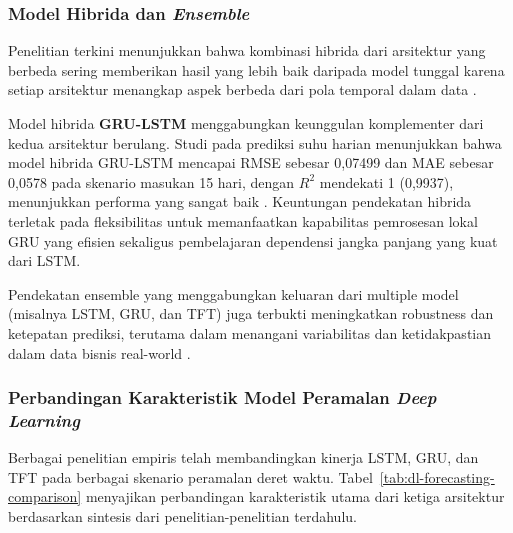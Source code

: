 \subsubsection{Model Hibrida dan \textit{Ensemble}}

Penelitian terkini menunjukkan bahwa kombinasi hibrida dari arsitektur yang berbeda sering memberikan hasil yang lebih baik daripada model tunggal karena setiap arsitektur menangkap aspek berbeda dari pola temporal dalam data \autocite{Yunita2025NNComparison,Zhang2024ComprehensiveTSFSurvey}.

Model hibrida \textbf{GRU-LSTM} menggabungkan keunggulan komplementer dari kedua arsitektur berulang. Studi pada prediksi suhu harian menunjukkan bahwa model hibrida GRU-LSTM mencapai RMSE sebesar 0{,}07499 dan MAE sebesar 0{,}0578 pada skenario masukan 15 hari, dengan \(R^2\) mendekati 1 (0{,}9937), menunjukkan performa yang sangat baik \autocite{Diqi2023GRULSTMHybrid}. Keuntungan pendekatan hibrida terletak pada fleksibilitas untuk memanfaatkan kapabilitas pemrosesan lokal GRU yang efisien sekaligus pembelajaran dependensi jangka panjang yang kuat dari LSTM.

Pendekatan ensemble yang menggabungkan keluaran dari multiple model (misalnya LSTM, GRU, dan TFT) juga terbukti meningkatkan robustness dan ketepatan prediksi, terutama dalam menangani variabilitas dan ketidakpastian dalam data bisnis real-world \autocite{Zhang2024ComprehensiveTSFSurvey,Yunita2025NNComparison}.

\subsubsection{Perbandingan Karakteristik Model Peramalan \textit{Deep Learning}}

Berbagai penelitian empiris telah membandingkan kinerja LSTM, GRU, dan TFT pada berbagai skenario peramalan deret waktu. Tabel~\ref{tab:dl-forecasting-comparison} menyajikan perbandingan karakteristik utama dari ketiga arsitektur berdasarkan sintesis dari penelitian-penelitian terdahulu.


